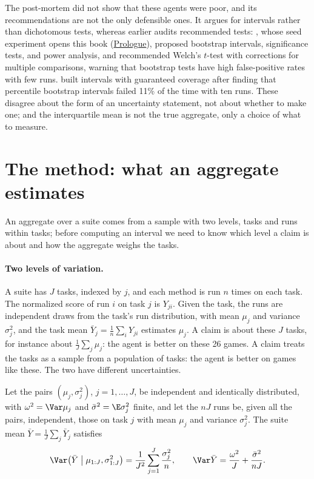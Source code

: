 \begin{refsection}
The post-mortem did not show that these agents were poor, and its recommendations are not the only defensible ones. It argues for intervals rather than dichotomous tests, whereas earlier audits recommended tests: \textcite{HendersonEtAl2018}, whose seed experiment opens this book (\hyperref[ch:prologue]{Prologue}), proposed bootstrap intervals, significance tests, and power analysis, and \textcite{ColasEtAl2018,ColasEtAl2019} recommended Welch's $t$-test with corrections for multiple comparisons, warning that bootstrap tests have high false-positive rates with few runs. \Textcite{JordanEtAl2020} built intervals with guaranteed coverage after finding that percentile bootstrap intervals failed 11\% of the time with ten runs. These disagree about the form of an uncertainty statement, not about whether to make one; and the interquartile mean is not the true aggregate, only a choice of what to measure.

\section{The method: what an aggregate estimates}\label{sec:aggregates:estimates}

An aggregate over a suite comes from a sample with two levels, tasks and runs within tasks; before computing an interval we need to know which level a claim is about and how the aggregate weighs the tasks.

\paragraph{Two levels of variation.} A suite has $J$ tasks, indexed by $j$, and each method is run $n$ times on each task. The normalized score of run $i$ on task $j$ is $Y_{ji}$. Given the task, the runs are independent draws from the task's run distribution, with mean $\mu_j$ and variance $\sigma_j^2$, and the task mean $\bar Y_j=\frac1n\sum_iY_{ji}$ estimates $\mu_j$. A  claim is about these $J$ tasks, for instance about $\frac1J\sum_j\mu_j$: the agent is better on these 26 games. A  claim treats the tasks as a sample from a population of tasks: the agent is better on games like these. The two have different uncertainties.

\begin{proposition}\label{prop:aggregates:twolevel}
Let the pairs $(\mu_j,\sigma_j^2)$, $j=1,\dots,J$, be independent and identically distributed, with $\omega^2=\Var\mu_j$ and $\bar\sigma^2=\E\sigma_j^2$ finite, and let the $nJ$ runs be, given all the pairs, independent, those on task $j$ with mean $\mu_j$ and variance $\sigma_j^2$. The suite mean $\bar Y=\frac1J\sum_j\bar Y_j$ satisfies
\begin{equation}\label{eq:aggregates:twolevel}
  \Var\bigl(\bar Y\bigm|\mu_{1:J},\sigma^2_{1:J}\bigr)=\frac1{J^2}\sum_{j=1}^J\frac{\sigma_j^2}n,\qquad
  \Var\bar Y=\frac{\omega^2}J+\frac{\bar\sigma^2}{nJ}.
\end{equation}
\end{proposition}


\end{refsection}

